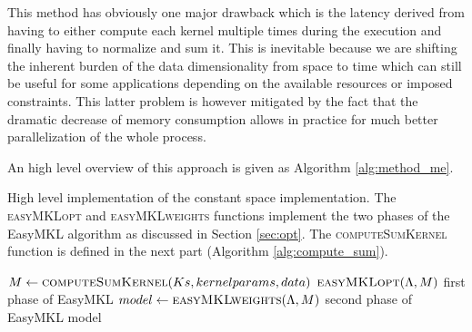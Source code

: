 This method has obviously one major drawback which is the latency derived from
having to either compute each kernel multiple times during the execution and
finally having to normalize and sum it.
This is inevitable because we are shifting the inherent burden of the data dimensionality
from space to time which can still be useful for some applications
depending on the available resources or imposed constraints.
This latter problem is however mitigated by the fact that the dramatic decrease
of memory consumption allows in practice for much better parallelization of the
whole process.

An high level overview of this approach is given as Algorithm \ref{alg:method_me}.
\begin{algorithm}
    \caption{
        High level implementation of the constant space implementation.
        The \textsc{easyMKLopt} and \textsc{easyMKLweights} functions implement
        the two phases of the EasyMKL algorithm as discussed in Section \ref{sec:opt}.
        The \textsc{computeSumKernel} function is defined in the next part
        (Algorithm \ref{alg:compute_sum}).
    }

    \label{alg:method_me}
    \begin{algorithmic}[1]
                    \State $M \gets \Call{computeSumKernel}{Ks,kernelparams,data}$
                    \State $\Call{easyMKLopt}{\Lambda,M}$
                    \Comment first phase of EasyMKL
                    \State $model \gets \Call{easyMKLweights}{\Lambda,M}$
                    \Comment second phase of EasyMKL
                    \State \Return model
%            

    \end{algorithmic}
\end{algorithm}

